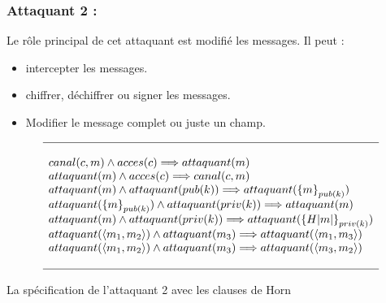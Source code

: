\documentclass[10pt,a4paper]{article}
\begin{document}
\subsubsection{Attaquant 2 :}
Le rôle principal de cet attaquant est modifié les messages. Il peut :
\begin{itemize}
\item intercepter les messages.
\item chiffrer, déchiffrer ou signer les messages.
\item Modifier le message complet ou juste un champ.\\
\end{itemize}
\[
\begin{array}{l}
\hline
\\
canal(c,m)\wedge acces(c)\Longrightarrow attaquant(m)\\
attaquant(m)\wedge acces(c)\Longrightarrow canal(c,m)\\
attaquant(m)\wedge attaquant(pub(k))\Longrightarrow attaquant({\lbrace m\rbrace}_{pub(k)})
\\
attaquant({\lbrace m\rbrace}_{pub(k)}) \wedge attaquant(priv(k))\Longrightarrow attaquant(m) 
\\ 
attaquant(m)\wedge attaquant(priv(k))\Longrightarrow attaquant({\lbrace H|m|\rbrace}_{priv(k)})
\\
attaquant(\langle m_{1},m_{2}\rangle)\wedge attaquant(m_{3})\Longrightarrow attaquant(\langle m_{1},m_{3}\rangle)\\ 
attaquant(\langle m_{1},m_{2}\rangle)\wedge attaquant(m_{3})\Longrightarrow attaquant(\langle m_{3},m_{2}\rangle)\\ 
\\
\hline  
\end{array}
\]
\caption{La spécification de l'attaquant 2 avec les clauses de Horn}
\end{document}
